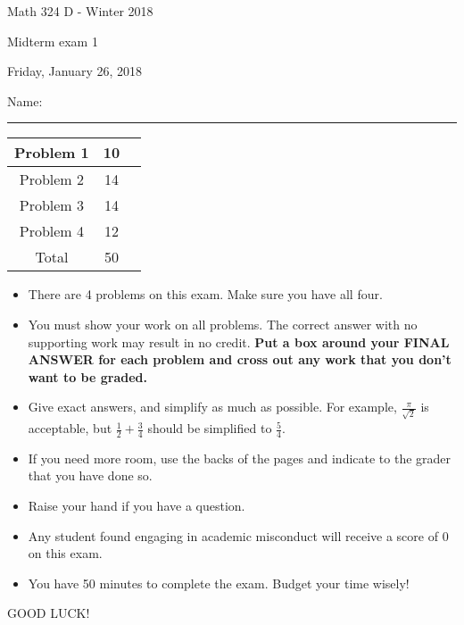 \documentclass[12 pt]{report}
\begin{document}
\noindent \vfill \noindent \large

\centerline{Math 324 D  - Winter 2018}

\centerline{Midterm exam 1}

\centerline{Friday, January 26, 2018}

\normalsize

\vfill
\medskip
Name: \rule{10cm}{1pt}

\bigskip

\vfill
\begin{center}
{\large
\begin{tabular}{||c|c|r||}
\hline Problem 1 & 10 & \hspace{10mm} \hfill \\
\hline Problem 2 & 14 & \hspace{10mm} \hfill \\
\hline Problem 3 & 14 & \hspace{10mm} \hfill \\
\hline Problem 4 & 12  & \hspace{10mm} \hfill \\
\hline Total & 50 & \hspace{10mm} \hfill \\
\hline
\end{tabular}
}
\end{center}
\vfill
\begin{itemize}
\item There are 4 problems on this exam. Make sure you have all four.
\item You must show your work on all problems.  The correct answer
with no supporting work may result in no credit. \textbf{Put a box
around your FINAL ANSWER for each problem and cross out any work
that you don't want to be graded.} 
\item Give exact answers, and simplify as much as possible. 
For example, $\frac{\pi}{\sqrt{2}}$ is acceptable, but $\frac{1}{2} + \frac{3}{4}$
should be simplified to $\frac{5}{4}$.   

\item If you need more room, use the backs
of the pages and indicate to the grader that you have done so.
\item Raise your hand if you have a question.
\item Any student found engaging in academic misconduct will receive
a score of 0 on this exam.
\item You have 50 minutes to complete the exam.  Budget your time wisely! \\
\end{itemize}
\vfill
\begin{center}GOOD LUCK!\end{center}
\end{document}
